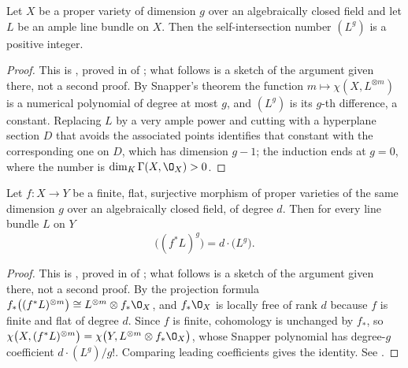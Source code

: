 \begin{proposition}
\label{prop:av-ample-self-intersection}
Let $X$ be a proper variety of dimension $g$ over an algebraically closed field
and let $L$ be an ample line bundle on $X$.  Then the self-intersection number
$(L^g)$ is a positive integer.
\end{proposition}
\begin{proof}
This is , proved in  of
; what follows is a sketch of the argument given there, not a
second proof.  By Snapper's theorem the function
$m\mapsto\chi(X,L^{\otimes m})$ is a numerical polynomial of degree at most
$g$, and $(L^g)$ is its $g$-th difference, a constant.  Replacing $L$ by a very
ample power and cutting with a hyperplane section $D$ that avoids the
associated points identifies that constant with the corresponding one on $D$,
which has dimension $g-1$; the induction ends at $g=0$, where the number is
$\dim_K\Gamma(X,\O_X)>0$.
\end{proof}

\begin{proposition}
\label{prop:av-degree-intersection}
Let $f\colon X\to Y$ be a finite, flat, surjective morphism of proper varieties
of the same dimension $g$ over an algebraically closed field, of degree $d$.
Then for every line bundle $L$ on $Y$
\[
  \bigl((f^*L)^g\bigr)=d\cdot\bigl(L^g\bigr).
\]
\end{proposition}
\begin{proof}
This is , proved in
 of ; what follows is a sketch of
the argument given there, not a second proof.  By the projection formula
$f_*\bigl((f^*L)^{\otimes m}\bigr)\cong L^{\otimes m}\otimes f_*\O_X$, and
$f_*\O_X$ is locally free of rank $d$ because $f$ is finite and flat of degree
$d$.  Since $f$ is finite, cohomology is unchanged by $f_*$, so
$\chi\bigl(X,(f^*L)^{\otimes m}\bigr)=\chi\bigl(Y,L^{\otimes m}\otimes
f_*\O_X\bigr)$, whose Snapper polynomial has degree-$g$ coefficient
$d\cdot(L^g)/g!$.  Comparing leading coefficients gives the identity.  See
\cite[\S5]{MumfordAbelianVarieties}.
\end{proof}

